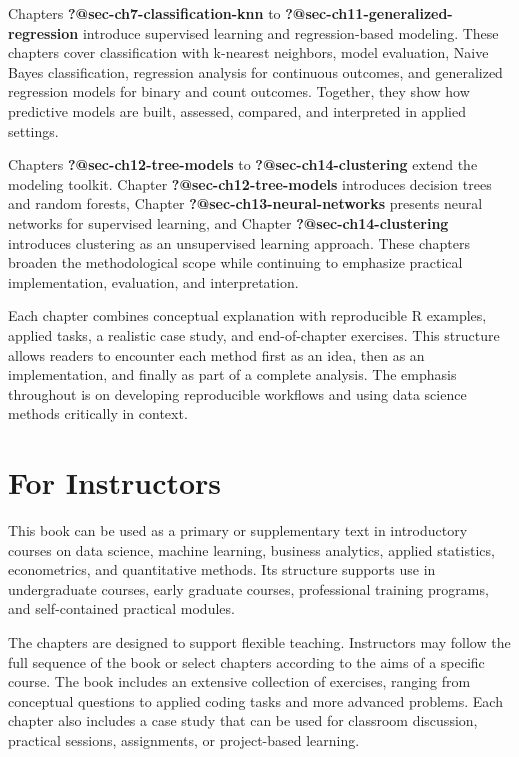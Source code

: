 \documentclass[
  letterpaper,
]{svmono}
\numberwithin{example}{subsection}
\begin{document}
Chapters \textbf{?@sec-ch7-classification-knn} to
\textbf{?@sec-ch11-generalized-regression} introduce supervised learning
and regression-based modeling. These chapters cover classification with
k-nearest neighbors, model evaluation, Naive Bayes classification,
regression analysis for continuous outcomes, and generalized regression
models for binary and count outcomes. Together, they show how predictive
models are built, assessed, compared, and interpreted in applied
settings.

Chapters \textbf{?@sec-ch12-tree-models} to
\textbf{?@sec-ch14-clustering} extend the modeling toolkit. Chapter
\textbf{?@sec-ch12-tree-models} introduces decision trees and random
forests, Chapter \textbf{?@sec-ch13-neural-networks} presents neural
networks for supervised learning, and Chapter
\textbf{?@sec-ch14-clustering} introduces clustering as an unsupervised
learning approach. These chapters broaden the methodological scope while
continuing to emphasize practical implementation, evaluation, and
interpretation.

Each chapter combines conceptual explanation with reproducible R
examples, applied tasks, a realistic case study, and end-of-chapter
exercises. This structure allows readers to encounter each method first
as an idea, then as an implementation, and finally as part of a complete
analysis. The emphasis throughout is on developing reproducible
workflows and using data science methods critically in context.

\section*{For Instructors}\label{for-instructors}


This book can be used as a primary or supplementary text in introductory
courses on data science, machine learning, business analytics, applied
statistics, econometrics, and quantitative methods. Its structure
supports use in undergraduate courses, early graduate courses,
professional training programs, and self-contained practical modules.

The chapters are designed to support flexible teaching. Instructors may
follow the full sequence of the book or select chapters according to the
aims of a specific course. The book includes an extensive collection of
exercises, ranging from conceptual questions to applied coding tasks and
more advanced problems. Each chapter also includes a case study that can
be used for classroom discussion, practical sessions, assignments, or
project-based learning.
\end{document}
